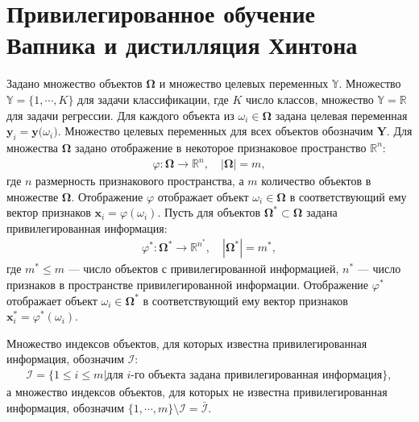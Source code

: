 \section{Привилегированное обучение Вапника и дистилляция Хинтона}

Задано множество объектов $\bm{\Omega}$ и множество целевых переменных $\mathbb{Y}$. Множество $\mathbb{Y}=\{1,\cdots,K\}$ для задачи классификации, где $K$ число классов, множество $\mathbb{Y}=\mathbb{R}$ для задачи регрессии.
Для каждого объекта из $\omega_i \in \bm{\Omega}$ задана целевая переменная $\mathbf{y}_i = \mathbf{y}\bigr(\omega_i\bigr)$. Множество целевых переменных для всех объектов обозначим $\mathbf{Y}$.
Для множества $\bm{\Omega}$ задано отображение в некоторое признаковое пространство $\mathbb{R}^{n}$:
\[
\label{eq:st:phi}
\begin{aligned}
\varphi:\bm{\Omega} \to \mathbb{R}^{n}, \quad \left|\bm{\Omega}\right| = m,
\end{aligned}
\]
где $n$ размерность признакового пространства, а $m$ количество объектов в множестве $\bm{\Omega}$. Отображение $\varphi$ отображает объект $\omega_i \in \bm{\Omega}$ в соответствующий ему вектор признаков $\mathbf{x}_i = \varphi(\omega_i)$.
Пусть для объектов $\bm{\Omega}^* \subset \bm{\Omega}$ задана привилегированная информация:
\[
\label{eq:st:phi*}
\begin{aligned}
\varphi^*:\bm{\Omega}^* \to \mathbb{R}^{n^*}, \quad \left|\bm{\Omega}^*\right| = m^*,
\end{aligned}
\]
где $m^* \leq m$ --- число объектов с привилегированной информацией, $n^*$ --- число признаков в пространстве привилегированной информации. Отображение $\varphi^*$ отображает объект $\omega_i \in \bm{\Omega^*}$ в соответствующий ему вектор признаков $\mathbf{x}^*_i = \varphi^*(\omega_i)$.

Множество индексов объектов, для которых известна привилегированная информация, обозначим $\mathcal{I}$:
\[
\label{eq:st:3}
\begin{aligned}
\mathcal{I} = \{1 \leq i \leq m | \text{для $i$-го объекта задана привилегированная информация}\},
\end{aligned}
\]
а множество индексов объектов, для которых не известна привилегированная информация, обозначим $\{1, \cdots, m\}\setminus \mathcal{I} = \bar{\mathcal{I}}$.

